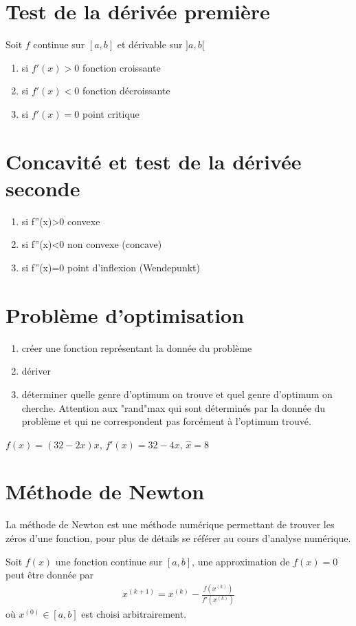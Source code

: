 \section{Test de la dérivée première}
Soit $f$ continue sur $[a,b]$ et dérivable sur $]a,b[$
\begin{enumerate}
	\item si $f'(x)>0$  fonction croissante
	\item si $f'(x)<0$  fonction décroissante
	\item si $f'(x)=0$  point critique
\end{enumerate}
\section{Concavité et test de la dérivée seconde}
	\begin{enumerate}
		\item si f''(x)>0 convexe
		\item si f''(x)<0 non convexe (concave)
		\item si f''(x)=0 point d'inflexion (Wendepunkt)
	\end{enumerate}
\section{Problème d'optimisation}
\begin{enumerate}
	\item créer une fonction représentant la donnée du problème
	\item dériver
	\item déterminer quelle genre d'optimum on trouve et quel genre d'optimum on cherche. Attention aux "rand"max qui sont déterminés par la donnée du problème et qui ne correspondent pas forcément à l'optimum trouvé.
\end{enumerate}

\begin{myExample}
	$f(x)=(32-2x)x$, $f'(x)=32-4x$, $\hat x=8$
\end{myExample}

\section{Méthode de Newton}	
La méthode de Newton est une méthode numérique permettant de trouver les zéros d'une fonction, pour plus de détails se référer au cours d'analyse numérique.

Soit $f(x)$ une fonction continue sur $[a,b]$, une approximation de $f(x)=0$ peut être donnée par
\begin{eqnarray}
	x^{(k+1)}=x^{(k)}-\frac{f(x^{(k)})}{f'(x^{(k)})}
\end{eqnarray}
où $x^{(0)}\in[a,b]$ est choisi arbitrairement.

